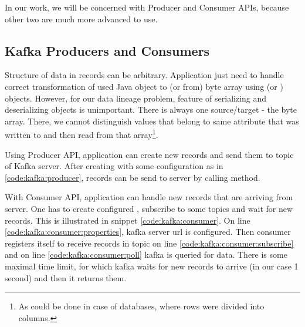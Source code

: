 In our work, we will be concerned with Producer and Consumer APIs,
because other two are much more advanced to use.



\subsection{Kafka Producers and Consumers}


Structure of data in records can be arbitrary. Application just need to handle
correct transformation of used Java object to (or from) byte array using
 (or ) objects.
However, for our data lineage problem, feature of serializing
and deserializing objects is unimportant. There is always one
source/target - the byte array. There, we cannot distinguish values
that belong to same attribute that was written to and then read from that array\footnote{
  As could be done in case of databases, where rows were divided into columns.
}.

Using Producer API, application can create new records and send them to topic of Kafka server.
After creating  with some configuration as in \ref{code:kafka:producer},
records can be send to server by calling  method.

With Consumer API, application can handle new records that are arriving from server.
One has to create configured , subscribe to some topics
and wait for new records. This is illustrated in snippet \ref{code:kafka:consumer}.
On line \ref{code:kafka:consumer:properties}, kafka server url is configured.
Then consumer registers itself to receive records in topic 
on line \ref{code:kafka:consumer:subscribe} and on line \ref{code:kafka:consumer:poll}
kafka is queried for data. There is some maximal time limit, for which kafka waits for
new records to arrive (in our case 1 second) and then it returns them.







